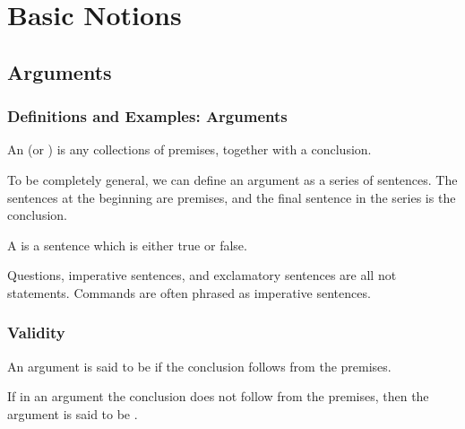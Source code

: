 \documentclass[12pt, a4paper, oneside, openright, titlepage]{book}
\begin{document}
\tableofcontents

\part{Basic Notions}




\chapter{\textsection\textsection Arguments}


\section{\textsection Definitions and Examples: Arguments}

\begin{defn}
    An  (or ) is any collections of premises, together with a conclusion.

    To be completely general, we can define an argument as a series of sentences. The sentences at the beginning are premises, and the final sentence in the series is the conclusion.
\end{defn}

\begin{defn}
    A  is a sentence which is either true or false.
\end{defn}


\begin{rmk}
    Questions, imperative sentences, and exclamatory sentences are all not statements. Commands are often phrased as imperative sentences.
\end{rmk}



\section{\textsection Validity}

\begin{defn}{}
    An argument is said to be  if the conclusion follows from the premises.
\end{defn}

\begin{defn}{}
    If in an argument the conclusion does not follow from the premises, then the argument is said to be .
\end{defn}
\end{document}
